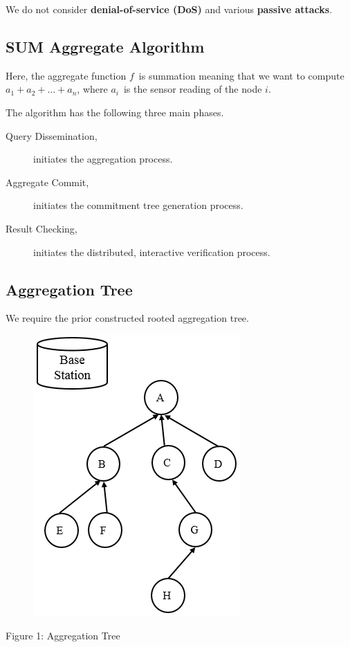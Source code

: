 \documentclass[%
  slidesonly,%
  semlayer%
  ]{seminar}                                  %
\begin{document}
\begin{slide}
      We do not consider \textbf{denial-of-service (DoS)} and various \textbf{passive attacks}.
      \vfill
      \clearpage

    \subsection*{SUM Aggregate Algorithm}
      \vfill
      Here, the aggregate function $f$\ is summation meaning that we want to compute $a_{1} + a_{2} + \dotsc + a_{n}$, where $a_{i}$\ is the sensor reading of the node $i$.
 
      The algorithm has the following three main phases.
      \begin{description}
        \item [Query Dissemination,] initiates the aggregation process.
        \item [Aggregate Commit,] initiates the commitment tree generation process.
        \item [Result Checking,] initiates the distributed, interactive verification process.
      \end{description}
      \vfill
      \clearpage

    \subsection*{Aggregation Tree}
      \vfill
      We require the prior constructed rooted aggregation tree.
      \begin{figure}[h!]
        \centering
        \includegraphics[scale=0.4]{images/aggregation-tree-1.png}
        \label{fig:Aggregation-tree-1}
      \end{figure}
      \begin{center}
        Figure 1: Aggregation Tree
      \end{center}
      \vfill
      \clearpage


\end{slide}
\end{document}
